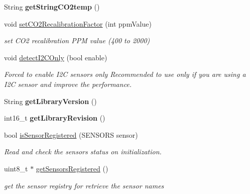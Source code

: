 \begin{DoxyCompactItemize}
\mbox{\label{classSensors_a613010a0ffd5fef1ac4942d0187b8d4a}} 
String {\bfseries get\+String\+C\+O2temp} ()
\item 
\mbox{\label{classSensors_a47f337a24231440b661d57ed8e873a64}} 
void \hyperlink{classSensors_a47f337a24231440b661d57ed8e873a64}{set\+C\+O2\+Recalibration\+Factor} (int ppm\+Value)
\begin{DoxyCompactList}\small\item\em set C\+O2 recalibration P\+PM value (400 to 2000) \end{DoxyCompactList}\item 
\mbox{\label{classSensors_ae25465fbd64d3b2b9ae31e2cb5a4b246}} 
void \hyperlink{classSensors_ae25465fbd64d3b2b9ae31e2cb5a4b246}{detect\+I2\+C\+Only} (bool enable)
\begin{DoxyCompactList}\small\item\em Forced to enable I2C sensors only Recommended to use only if you are using a I2C sensor and improve the performance. \end{DoxyCompactList}\item 
\mbox{\label{classSensors_af8c24cdf4179bf5bf7e799844e626b43}} 
String {\bfseries get\+Library\+Version} ()
\item 
\mbox{\label{classSensors_adb026d51c7801930b26730371244bb5e}} 
int16\+\_\+t {\bfseries get\+Library\+Revision} ()
\item 
bool \hyperlink{classSensors_ac1cf4e90258eb2fcbdc8cf7c1f75a1c1}{is\+Sensor\+Registered} (S\+E\+N\+S\+O\+RS sensor)
\begin{DoxyCompactList}\small\item\em Read and check the sensors status on initialization. \end{DoxyCompactList}\item 
uint8\+\_\+t $\ast$ \hyperlink{classSensors_af9ee8f89e81d76a4c2b41ed6dc38f2f3}{get\+Sensors\+Registered} ()
\begin{DoxyCompactList}\small\item\em get the sensor registry for retrieve the sensor names \end{DoxyCompactList}\item 
\mbox{\label{classSensors_ad8395e69cf5dcc68d0a8049ec7372a81}} 

\end{DoxyCompactItemize}
